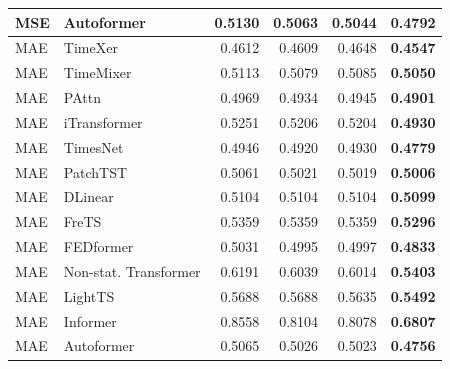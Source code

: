 \begin{longtable}{llrrrr}
MSE & Autoformer & 0.5130 & 0.5063 & 0.5044 & \textbf{0.4792} \\
\midrule
MAE & TimeXer & 0.4612 & 0.4609 & 0.4648 & \textbf{0.4547} \\
MAE & TimeMixer & 0.5113 & 0.5079 & 0.5085 & \textbf{0.5050} \\
MAE & PAttn & 0.4969 & 0.4934 & 0.4945 & \textbf{0.4901} \\
MAE & iTransformer & 0.5251 & 0.5206 & 0.5204 & \textbf{0.4930} \\
MAE & TimesNet & 0.4946 & 0.4920 & 0.4930 & \textbf{0.4779} \\
MAE & PatchTST & 0.5061 & 0.5021 & 0.5019 & \textbf{0.5006} \\
MAE & DLinear & 0.5104 & 0.5104 & 0.5104 & \textbf{0.5099} \\
MAE & FreTS & 0.5359 & 0.5359 & 0.5359 & \textbf{0.5296} \\
MAE & FEDformer & 0.5031 & 0.4995 & 0.4997 & \textbf{0.4833} \\
MAE & Non-stat. Transformer & 0.6191 & 0.6039 & 0.6014 & \textbf{0.5403} \\
MAE & LightTS & 0.5688 & 0.5688 & 0.5635 & \textbf{0.5492} \\
MAE & Informer & 0.8558 & 0.8104 & 0.8078 & \textbf{0.6807} \\
MAE & Autoformer & 0.5065 & 0.5026 & 0.5023 & \textbf{0.4756} \\
\end{longtable}
\endgroup

